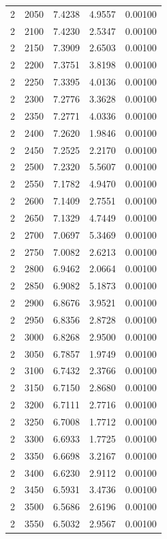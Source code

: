 \begin{longtable}{ccccc}
    2 & 2050 & 7.4238 & 4.9557 & 0.00100 \\
    2 & 2100 & 7.4230 & 2.5347 & 0.00100 \\
    2 & 2150 & 7.3909 & 2.6503 & 0.00100 \\
    2 & 2200 & 7.3751 & 3.8198 & 0.00100 \\
    2 & 2250 & 7.3395 & 4.0136 & 0.00100 \\
    2 & 2300 & 7.2776 & 3.3628 & 0.00100 \\
    2 & 2350 & 7.2771 & 4.0336 & 0.00100 \\
    2 & 2400 & 7.2620 & 1.9846 & 0.00100 \\
    2 & 2450 & 7.2525 & 2.2170 & 0.00100 \\
    2 & 2500 & 7.2320 & 5.5607 & 0.00100 \\
    2 & 2550 & 7.1782 & 4.9470 & 0.00100 \\
    2 & 2600 & 7.1409 & 2.7551 & 0.00100 \\
    2 & 2650 & 7.1329 & 4.7449 & 0.00100 \\
    2 & 2700 & 7.0697 & 5.3469 & 0.00100 \\
    2 & 2750 & 7.0082 & 2.6213 & 0.00100 \\
    2 & 2800 & 6.9462 & 2.0664 & 0.00100 \\
    2 & 2850 & 6.9082 & 5.1873 & 0.00100 \\
    2 & 2900 & 6.8676 & 3.9521 & 0.00100 \\
    2 & 2950 & 6.8356 & 2.8728 & 0.00100 \\
    2 & 3000 & 6.8268 & 2.9500 & 0.00100 \\
    2 & 3050 & 6.7857 & 1.9749 & 0.00100 \\
    2 & 3100 & 6.7432 & 2.3766 & 0.00100 \\
    2 & 3150 & 6.7150 & 2.8680 & 0.00100 \\
    2 & 3200 & 6.7111 & 2.7716 & 0.00100 \\
    2 & 3250 & 6.7008 & 1.7712 & 0.00100 \\
    2 & 3300 & 6.6933 & 1.7725 & 0.00100 \\
    2 & 3350 & 6.6698 & 3.2167 & 0.00100 \\
    2 & 3400 & 6.6230 & 2.9112 & 0.00100 \\
    2 & 3450 & 6.5931 & 3.4736 & 0.00100 \\
    2 & 3500 & 6.5686 & 2.6196 & 0.00100 \\
    2 & 3550 & 6.5032 & 2.9567 & 0.00100 \\

\end{longtable}
